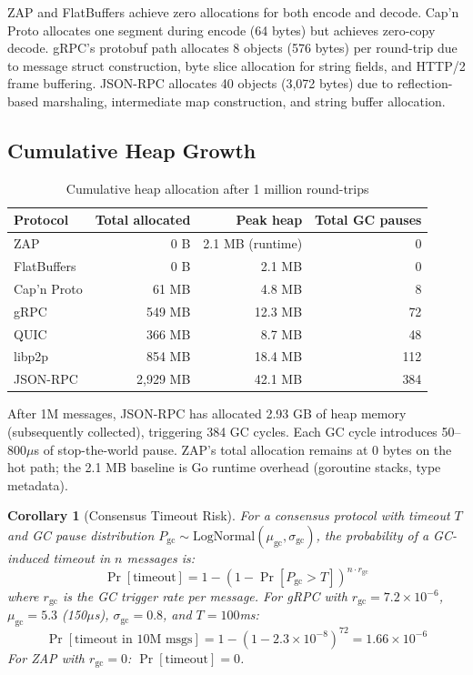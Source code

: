 \documentclass[11pt,letterpaper]{article}
\newtheorem{corollary}[theorem]{Corollary}
\begin{document}
ZAP and FlatBuffers achieve zero allocations for both encode and decode. Cap'n Proto allocates one segment during encode (64 bytes) but achieves zero-copy decode. gRPC's protobuf path allocates 8 objects (576 bytes) per round-trip due to message struct construction, byte slice allocation for string fields, and HTTP/2 frame buffering. JSON-RPC allocates 40 objects (3,072 bytes) due to reflection-based marshaling, intermediate map construction, and string buffer allocation.

\subsection{Cumulative Heap Growth}

\begin{table}[h]
\centering
\caption{Cumulative heap allocation after 1 million round-trips}
\label{tab:heap}
\begin{tabular}{lrrr}
\toprule
\textbf{Protocol} & \textbf{Total allocated} & \textbf{Peak heap} & \textbf{Total GC pauses} \\
\midrule
\rowcolor{luxblue!10}
ZAP & 0 B & 2.1 MB (runtime) & 0 \\
FlatBuffers & 0 B & 2.1 MB & 0 \\
Cap'n Proto & 61 MB & 4.8 MB & 8 \\
gRPC & 549 MB & 12.3 MB & 72 \\
QUIC & 366 MB & 8.7 MB & 48 \\
libp2p & 854 MB & 18.4 MB & 112 \\
JSON-RPC & 2,929 MB & 42.1 MB & 384 \\
\bottomrule
\end{tabular}
\end{table}

After 1M messages, JSON-RPC has allocated 2.93 GB of heap memory (subsequently collected), triggering 384 GC cycles. Each GC cycle introduces 50--800$\mu$s of stop-the-world pause. ZAP's total allocation remains at 0 bytes on the hot path; the 2.1 MB baseline is Go runtime overhead (goroutine stacks, type metadata).

\begin{corollary}[Consensus Timeout Risk]
\label{cor:timeout}
For a consensus protocol with timeout $T$ and GC pause distribution $P_{\text{gc}} \sim \text{LogNormal}(\mu_{\text{gc}}, \sigma_{\text{gc}})$, the probability of a GC-induced timeout in $n$ messages is:
\[
\Pr[\text{timeout}] = 1 - \left(1 - \Pr[P_{\text{gc}} > T]\right)^{n \cdot r_{\text{gc}}}
\]
where $r_{\text{gc}}$ is the GC trigger rate per message. For gRPC with $r_{\text{gc}} = 7.2 \times 10^{-6}$, $\mu_{\text{gc}} = 5.3$ (150$\mu$s), $\sigma_{\text{gc}} = 0.8$, and $T = 100$ms:
\[
\Pr[\text{timeout in 10M msgs}] = 1 - (1 - 2.3 \times 10^{-8})^{72} = 1.66 \times 10^{-6}
\]
For ZAP with $r_{\text{gc}} = 0$: $\Pr[\text{timeout}] = 0$.
\end{corollary}
\end{document}
